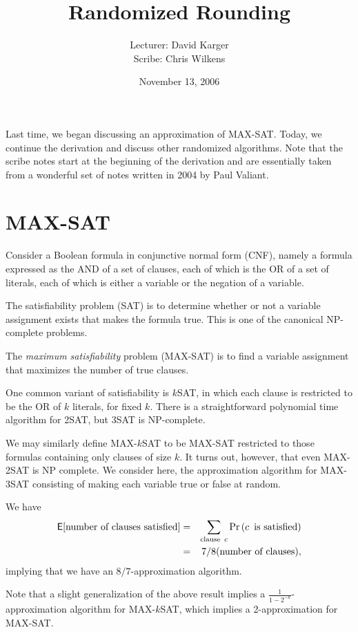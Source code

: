 \documentclass{article}
\title{Randomized Rounding}
\date{November 13, 2006}
\author{Lecturer: David Karger\\ Scribe: Chris Wilkens}
\renewcommand{\Pr}[1]{\textrm{\textup{Pr}}\left( #1 \right)}
\newcommand{\E}{\mbox{$\mathsf E$}}
\begin{document}
\maketitle

Last time, we began discussing an approximation of MAX-SAT. Today, we continue the derivation and discuss other randomized algorithms. Note that the scribe notes start at the beginning of the derivation and are essentially taken from a wonderful set of notes written in 2004 by Paul Valiant.

\section{MAX-SAT}

Consider a Boolean formula in conjunctive normal form (CNF), namely a formula expressed as the AND of a set of clauses, each of which is the OR of a set of literals, each of which is either a variable or the negation of a variable.

The satisfiability problem (SAT) is to determine whether or not a variable assignment exists that makes the formula true.  This is one of the canonical NP-complete problems.

The \emph{maximum satisfiability} problem (MAX-SAT) is to find a variable assignment that maximizes the number of true clauses.

One common variant of satisfiability is $k$SAT, in which each clause is restricted to be the OR of $k$ literals, for fixed $k$.  There is a straightforward polynomial time algorithm for 2SAT, but 3SAT is NP-complete.

We may similarly define MAX-$k$SAT to be MAX-SAT restricted to those formulas containing only clauses of size $k$.  It turns out, however, that even MAX-2SAT is NP complete.  We consider here, the approximation algorithm for MAX-3SAT consisting of making each variable true or false at random.

We have 
\begin{align}
\E[\textrm{number of clauses satisfied}]&=&\sum_{\textrm{clause\enspace} c}\Pr{c\textrm{\enspace is satisfied}}\\
&=&7/8 (\textrm{number of clauses}),
\end{align}
implying that we have an $8/7$-approximation algorithm.

Note that a slight generalization of the above result implies a $\frac{1}{1-2^{-k}}$-approximation algorithm for MAX-$k$SAT, which implies a 2-approximation for MAX-SAT.
\end{document}

